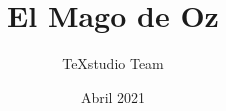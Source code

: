 \documentclass[12pt,twoside,onecolumn,openany]{book}
\begin{document}
\author{TeXstudio Team}
\title{El Mago de Oz}
\date{Abril 2021}

\frontmatter
\maketitle

















\end{document}
